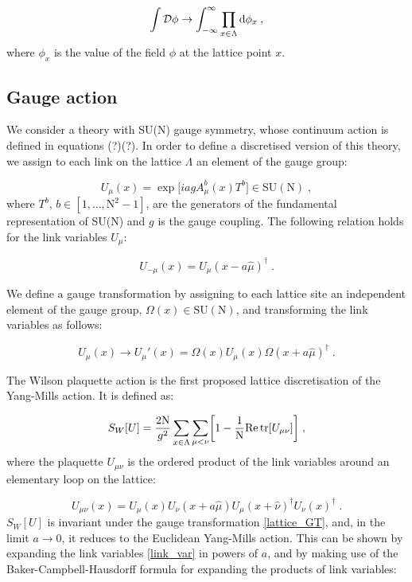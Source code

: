 \begin{equation}
\int \mathcal D \phi \to \int_{-\infty}^{\infty} \prod_{x \in \Lambda} \mathrm{d} \phi_x \: ,
\end{equation}
%
where $\phi_x$ is the value of the field $\phi$ at the lattice point $x$.

\subsection{Gauge action}

We consider a theory with SU(N) gauge symmetry, whose continuum action is defined in equations (?)(?).  In order to define a discretised version of this theory, we assign to each link on the lattice $\Lambda$ an element of the gauge group:

\begin{equation}
U_ {\mu}(x) = \exp\biggl[i a  g A^b_{\mu}(x) T^b \biggr] \in \mathrm{SU(N)} \; ,
\label{link_var}
\end{equation}
%
where $T^b$, $b \in  [1, \dots, \mathrm{N}^2 -1]$, are the generators of the fundamental representation  of  SU(N) and $g$ is the gauge coupling. The following relation holds for the link variables $U_{\mu}$:

\begin{equation}
U_{-\mu}(x)  = U_{\mu}(x - a\hat\mu)^{\dagger} \; .
\end{equation}

We define a gauge transformation by assigning to each lattice site an independent element of the gauge group, $\Omega(x) \in \mathrm{SU(N)}$,  and transforming the  link variables as follows:

\begin{equation}
U_ {\mu}(x) \to  U_{\mu}'(x) = \Omega(x) U_{\mu}(x) \Omega(x+  a \hat \mu)^{\dagger} \; .
\label{lattice_GT}
\end{equation}

The  Wilson plaquette action \cite{Wilson:1974sk} is the first proposed lattice discretisation of the  Yang-Mills action. It is defined as:

\begin{equation}
S_W[U] =  \frac{2 \mathrm N}{g^2} \sum_{x \in \Lambda}  \sum_{\mu < \nu} \biggl[  1 - \frac{1}{\mathrm{N}} \mathrm{Re} \tr  [U_{\mu \nu}] \biggr] \; ,
\end{equation}
%
where the plaquette $U_{\mu \nu}$ is the ordered product of the link variables around an elementary loop on the lattice:

\begin{equation}
U_{\mu \nu}(x)  = U_{\mu}(x) U_{\nu}(x + a\hat\mu) U_{\mu}(x+\hat\nu)^{\dagger} U_{\nu}(x) ^{\dagger}   \; .
\label{plaquette}
\end{equation}
%
$S_W[U]$ is invariant under the gauge transformation \ref{lattice_GT}, and, in the limit $a \to 0$, it reduces to the Euclidean Yang-Mills action.
This can be shown by expanding the link variables \ref{link_var} in powers of $a$, and by making use of the Baker-Campbell-Hausdorff formula for expanding the products of link variables:

